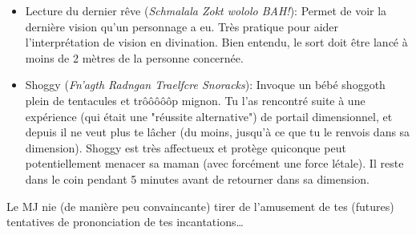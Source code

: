 {\begin{itemize}
		\item Lecture du dernier rêve (\emph{Schmalala Zokt wololo BAH!}): Permet de voir la dernière vision qu'un personnage a eu. Très pratique pour aider l'interprétation de vision en divination. Bien entendu, le sort doit être lancé à moins de 2 mètres de la personne concernée.
		
		\item Shoggy (\emph{Fn'agth Radngan Traelfcre Snoracks}): Invoque un bébé shoggoth plein de tentacules et trôôôôôp mignon. Tu l'as rencontré suite à une expérience (qui était une "réussite alternative") de portail dimensionnel, et depuis il ne veut plus te lâcher (du moins, jusqu'à ce que tu le renvois dans sa dimension). Shoggy est très affectueux et protège quiconque peut potentiellement menacer sa maman (avec forcément une force létale). Il reste dans le coin pendant 5 minutes avant de retourner dans sa dimension.
	\end{itemize}
	
	\par Le MJ nie (de manière peu convaincante) tirer de l'amusement de tes (futures) tentatives de prononciation de tes incantations\dots
}





